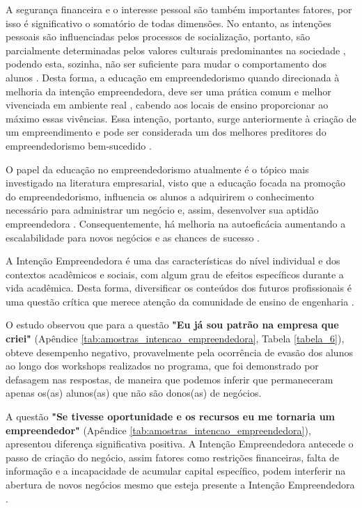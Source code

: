 A segurança financeira e o interesse pessoal são também importantes fatores, por isso é significativo o somatório de todas dimensões. No entanto, as intenções pessoais são influenciadas pelos processos de socialização, portanto, são parcialmente determinadas pelos valores culturais predominantes na sociedade \cite{schwartz_les_2006}, podendo esta, sozinha, não ser suficiente para mudar o comportamento dos alunos \cite{adelaja_students_2018}. Desta forma, a educação em empreendedorismo quando direcionada à melhoria da intenção empreendedora, deve ser uma prática comum e melhor vivenciada em ambiente real \cite{damanpour_phases_2006}, cabendo aos locais de ensino proporcionar ao máximo essas vivências. Essa intenção, portanto, surge anteriormente à criação de um empreendimento e pode ser considerada um dos melhores preditores do empreendedorismo bem-sucedido \cite{ajzen_attitudes_1987,krueger_competing_2000,garcia-rodriguez_entrepreneurial_2017}.

O papel da educação no empreendedorismo atualmente é o tópico mais investigado na literatura empresarial, visto  que a educação focada na promoção do empreendedorismo, influencia os alunos a adquirirem o conhecimento necessário para administrar um negócio e, assim,  desenvolver sua aptidão empreendedora \cite{nowinski_impact_2019}. Consequentemente, há melhoria na autoeficácia \cite{egerova_does_2017} aumentando a escalabilidade para novos negócios e as chances de sucesso \cite{kolstad_education_2015}.

A Intenção Empreendedora é uma das características do nível individual e dos contextos acadêmicos e sociais, com algum grau de efeitos específicos durante a vida acadêmica. Desta forma, diversificar os conteúdos dos futuros profissionais é uma questão crítica que merece atenção da comunidade de ensino de engenharia \cite{gilmartin_entrepreneurial_2019}.

O estudo observou que para a questão \textbf{"Eu já sou patrão na empresa que criei"} (Apêndice \ref{tab:amostras_intencao_empreendedora}, Tabela \ref{tabela_6}), obteve desempenho negativo, provavelmente pela ocorrência de evasão dos alunos ao longo dos workshops realizados no programa, que foi demonstrado por defasagem nas respostas, de maneira que podemos inferir que permaneceram apenas os(as) alunos(as) que não são donos(as) de negócios. 


A questão \textbf{"Se tivesse oportunidade e os recursos eu me tornaria um empreendedor"} (Apêndice \ref{tab:amostras_intencao_empreendedora}), apresentou diferença significativa positiva. A Intenção Empreendedora antecede o passo de criação do negócio, assim fatores como restrições financeiras, falta de informação e a incapacidade de acumular capital específico, podem interferir na abertura de novos negócios mesmo que esteja presente a Intenção Empreendedora \cite{auguste_what_2016}.


